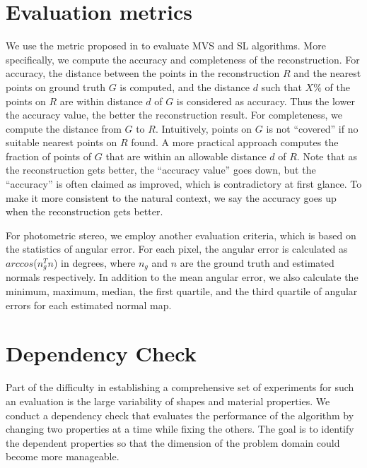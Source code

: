 \section{Evaluation metrics}
We use the metric proposed in \cite{seitz2006comparison} to evaluate MVS and SL algorithms. More specifically, we compute the accuracy and completeness of the reconstruction. For accuracy, the distance between the points in the reconstruction $R$ and the nearest points on ground truth $G$ is computed, and the distance $d$ such that $X\%$ of the points on $R$ are within distance $d$ of $G$ is considered as accuracy. Thus the lower the accuracy value, the better the reconstruction result. For completeness, we compute the distance from $G$ to $R$. Intuitively, points on $G$ is not ``covered'' if no suitable nearest points on $R$ found. A more practical approach computes the fraction of points of $G$ that are within an allowable distance $d$ of $R$.
Note that as the reconstruction gets better, the ``accuracy value'' goes down, but the ``accuracy'' is often claimed as improved, which is contradictory at first glance. To make it more consistent to the natural context, we say the accuracy goes up when the reconstruction gets better.

For photometric stereo, we employ another evaluation criteria, which is based on the statistics of angular error. For each pixel, the angular error is calculated as $arccos$($n_g^T n$) in degrees, where $n_g$ and $n$ are the ground truth and estimated normals respectively. In addition to the mean angular error, we also calculate the minimum, maximum, median, the first quartile, and the third quartile of angular errors for each estimated normal map.

\section{Dependency Check}
Part of the difficulty in establishing a comprehensive set of experiments for such an evaluation is the large variability of shapes and material properties. We conduct a dependency check that evaluates the performance of the algorithm by changing two properties at a time while fixing the others. The goal is to identify the dependent properties so that the dimension of the problem domain could become more manageable.


